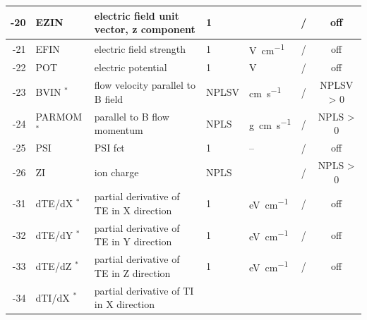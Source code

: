 \begin{landscape}
\begin{longtable}{|r|l|l|l|l|c|c|}
    -20                    & EZIN                         & electric field unit vector,
    z component            & 1                            &                                   & /              & off
    \\ \hline
    -21                    & EFIN                         & electric field strength
			   & 1                            & \si{\volt\per\centi\metre}        & /              & off
    \\ \hline
    -22                    & POT                          & electric potential
			   & 1                            & \si{\volt}                        & /              & off
    \\ \hline
    -23                    & BVIN $^*$                    & flow velocity parallel to B
    field                  & NPLSV                        & \si{\centi\metre\per\second}      & /              & NPLSV > 0
    \\ \hline
    -24                    & PARMOM $^*$                  & parallel to B flow momentum
			   & NPLS                         & \si{\gram\centi\metre\per\second} & /              & NPLS > 0
    \\ \hline
    -25                    & PSI
                           & PSI fct                      & 1                                 & --
			   & /              & off
    \\ \hline
    -26                    & ZI                           & ion charge
			   & NPLS                         &                                   & /              & NPLS > 0
    \\ \hline
    -31                    & dTE/dX $^*$
                           & partial derivative of TE in X direction
                           & 1                            & \si{\electronvolt\per\centi\meter}
			   & /              & off
    \\ \hline
    -32                    & dTE/dY $^*$
                           & partial derivative of TE in Y direction
                           & 1                            & \si{\electronvolt\per\centi\meter}
			   & /              & off
    \\ \hline
    -33                    & dTE/dZ $^*$
                           & partial derivative of TE in Z direction
                           & 1                            & \si{\electronvolt\per\centi\meter}
			   & /              & off
    \\ \hline
    -34                    & dTI/dX $^*$
                           & partial derivative of TI in X direction

\end{longtable}
\end{landscape}
